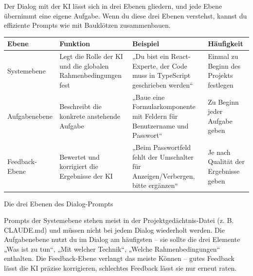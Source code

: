 


Der Dialog mit der KI lässt sich in drei Ebenen gliedern, und jede Ebene übernimmt eine eigene Aufgabe. Wenn du diese drei Ebenen verstehst, kannst du effiziente Prompts wie mit Bauklötzen zusammenbauen.

\begin{center}
\begin{tabularx}{\linewidth}{|X|X|X|X|}
\hline
\textbf{Ebene} & \textbf{Funktion} & \textbf{Beispiel} & \textbf{Häufigkeit} \tabularnewline
\hline
Systemebene & Legt die Rolle der KI und die globalen Rahmenbedingungen fest & „Du bist ein React-Experte, der Code muss in TypeScript geschrieben werden“ & Einmal zu Beginn des Projekts festlegen \tabularnewline
Aufgabenebene & Beschreibt die konkrete anstehende Aufgabe & „Baue eine Formularkomponente mit Feldern für Benutzername und Passwort“ & Zu Beginn jeder Aufgabe geben \tabularnewline
Feedback-Ebene & Bewertet und korrigiert die Ergebnisse der KI & „Beim Passwortfeld fehlt der Umschalter für Anzeigen/Verbergen, bitte ergänzen“ & Je nach Qualität der Ergebnisse geben \tabularnewline
\hline
\end{tabularx}
\end{center}

\begin{center}\small\color{gray}Die drei Ebenen des Dialog-Prompts\end{center}

Prompts der Systemebene stehen meist in der Projektgedächtnis-Datei (z. B. CLAUDE.md) und müssen nicht bei jedem Dialog wiederholt werden. Die Aufgabenebene nutzt du im Dialog am häufigsten – sie sollte die drei Elemente „Was ist zu tun“, „Mit welcher Technik“, „Welche Rahmenbedingungen“ enthalten. Die Feedback-Ebene verlangt das meiste Können – gutes Feedback lässt die KI präzise korrigieren, schlechtes Feedback lässt sie nur erneut raten.

